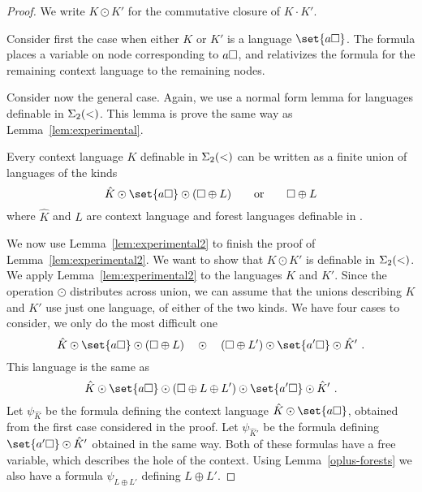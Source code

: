 \documentclass{LMCS}
\begin{document}
\begin{proof} 
We write $K \odot K'$ for the commutative closure of $K \cdot K'$.

Consider first the case when either $K$ or $K'$ is a language $\set{a
  \hole}$. The formula places a variable on node corresponding to $a
\Box$, and relativizes the formula for the remaining context language
to the remaining nodes. 

Consider now the general case. Again, we use a normal form lemma for languages definable in $\Sigma_2(<)$.  This lemma is prove the same way as Lemma~\ref{lem:experimental}.
\begin{lem}\label{lem:experimental2}
	Every context language $K$ definable in $\Sigma_2(<)$ can be  written as  a finite union
	of languages of the kinds
	\[
	  \hat K \odot \set{a \hole} \odot   (\hole \oplus L) 
	\qquad \mbox{or}\qquad 
	\hole \oplus L
	\]
	where $\hat K$ and $L$ are context language and forest languages definable in
	\Stwo.	
\end{lem}


We now use Lemma~\ref{lem:experimental2} to finish the proof of Lemma~\ref{lem:experimental2}. We want to show that $K \odot K'$ is definable in $\Sigma_2(<)$. We apply Lemma~\ref{lem:experimental2} to the languages $K$ and $K'$.
Since the operation $\odot$ distributes across union, we can assume
that  the unions describing $K$ and $K'$ use just one language, of either of the two kinds. We have four cases to consider, we only do the most difficult
one
\[
    \hat K \odot \set{a \hole} \odot   (\hole \oplus L)  \quad \odot
    \quad (\hole \oplus L') \odot \set{a' \hole} \odot     \hat K'\ .
\]
This language is the same as 
\[
    \hat K \odot \set{a \hole} \odot   (\hole \oplus L \oplus L')  \odot \set{a' \hole} \odot     \hat K'\ .
\]
Let $\psi_{\hat K}$ be the \Stwo formula defining the context language $\hat K \odot \set{a \hole}$, 
obtained from the first case considered in the proof.  Let $\psi_{\hat K'}$ be the \Stwo formula
defining $\set{a' \hole} \odot \hat K'$ obtained in the same way. Both of these formulas have a free variable, which describes the hole of the context. Using
Lemma~\ref{oplus-forests} we also have a \Stwo formula $\psi_{L \oplus L'}$
defining $L \oplus L'$.



\end{proof}
\end{document}
